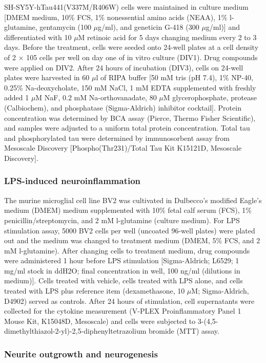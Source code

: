 \documentclass[letterpaper]{article}
\begin{document}
SH-SY5Y-hTau441(V337M/R406W) cells were maintained in culture medium [DMEM
medium, 10\% FCS, 1\% nonessential amino acids (NEAA), 1\% l-glutamine,
gentamycin (100 $\mu$g/ml), and geneticin G-418 (300 $\mu$g/ml)] and
differentiated with 10 $\mu$M retinoic acid for 5 days changing medium every 2
to 3 days. Before the treatment, cells were seeded onto 24-well plates at a
cell density of 2 $\times$ 105 cells per well on day one of in vitro culture
(DIV1). Drug compounds were applied on DIV2. After 24 hours of incubation
(DIV3), cells on 24-well plates were harvested in 60 $\mu$l of RIPA buffer [50
mM tris (pH 7.4), 1\% NP-40, 0.25\% Na-deoxycholate, 150 mM NaCl, 1 mM EDTA
supplemented with freshly added 1 $\mu$M NaF, 0.2 mM Na-orthovanadate, 80
$\mu$M glycerophosphate, protease (Calbiochem), and phosphatase
(Sigma-Aldrich) inhibitor cocktail]. Protein concentration was determined by
BCA assay (Pierce, Thermo Fisher Scientific), and samples were adjusted to a
uniform total protein concentration. Total tau and phosphorylated tau were
determined by immunosorbent assay from Mesoscale Discovery
[Phospho(Thr231)/Total Tau Kit K15121D, Mesoscale Discovery].

\subsubsection{LPS-induced neuroinflammation}

The murine microglial cell line BV2 was cultivated in Dulbecco’s modified
Eagle's medium (DMEM) medium supplemented with 10\% fetal calf serum (FCS),
1\% penicillin/streptomycin, and 2 mM l-glutamine (culture medium). For LPS
stimulation assay, 5000 BV2 cells per well (uncoated 96-well plates) were
plated out and the medium was changed to treatment medium (DMEM, 5\% FCS, and
2 mM l-glutamine). After changing cells to treatment medium, drug compounds
were administered 1 hour before LPS stimulation [Sigma-Aldrich; L6529; 1 mg/ml
stock in ddH2O; final concentration in well, 100 ng/ml (dilutions in medium)].
Cells treated with vehicle, cells treated with LPS alone, and cells treated
with LPS plus reference item (dexamethasone, 10 $\mu$M; Sigma-Aldrich, D4902)
served as controls. After 24 hours of stimulation, cell supernatants were
collected for the cytokine measurement (V-PLEX Proinflammatory Panel 1 Mouse
Kit, K15048D, Mesoscale) and cells were subjected to
3-(4,5-dimethylthiazol-2-yl)-2,5-diphenyltetrazolium bromide (MTT) assay.

\subsubsection{Neurite outgrowth and neurogenesis}
\end{document}
